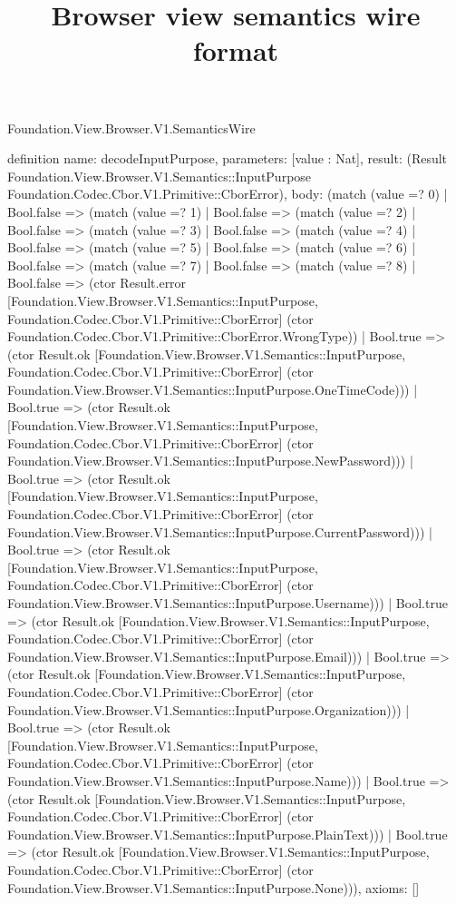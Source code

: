 \begin{lexlean}{Foundation.View.Browser.V1.SemanticsWire}
\title{Browser view semantics wire format}
\begin{semanticmodule}
definition{
  name: decodeInputPurpose,
  parameters: [value : Nat],
  result: (Result Foundation.View.Browser.V1.Semantics::InputPurpose Foundation.Codec.Cbor.V1.Primitive::CborError),
  body: (match (value =? 0)
    | Bool.false => (match (value =? 1)
      | Bool.false => (match (value =? 2)
        | Bool.false => (match (value =? 3)
          | Bool.false => (match (value =? 4)
            | Bool.false => (match (value =? 5)
              | Bool.false => (match (value =? 6)
                | Bool.false => (match (value =? 7)
                  | Bool.false => (match (value =? 8)
                    | Bool.false => (ctor Result.error [Foundation.View.Browser.V1.Semantics::InputPurpose, Foundation.Codec.Cbor.V1.Primitive::CborError] (ctor Foundation.Codec.Cbor.V1.Primitive::CborError.WrongType))
                    | Bool.true => (ctor Result.ok [Foundation.View.Browser.V1.Semantics::InputPurpose, Foundation.Codec.Cbor.V1.Primitive::CborError] (ctor Foundation.View.Browser.V1.Semantics::InputPurpose.OneTimeCode)))
                  | Bool.true => (ctor Result.ok [Foundation.View.Browser.V1.Semantics::InputPurpose, Foundation.Codec.Cbor.V1.Primitive::CborError] (ctor Foundation.View.Browser.V1.Semantics::InputPurpose.NewPassword)))
                | Bool.true => (ctor Result.ok [Foundation.View.Browser.V1.Semantics::InputPurpose, Foundation.Codec.Cbor.V1.Primitive::CborError] (ctor Foundation.View.Browser.V1.Semantics::InputPurpose.CurrentPassword)))
              | Bool.true => (ctor Result.ok [Foundation.View.Browser.V1.Semantics::InputPurpose, Foundation.Codec.Cbor.V1.Primitive::CborError] (ctor Foundation.View.Browser.V1.Semantics::InputPurpose.Username)))
            | Bool.true => (ctor Result.ok [Foundation.View.Browser.V1.Semantics::InputPurpose, Foundation.Codec.Cbor.V1.Primitive::CborError] (ctor Foundation.View.Browser.V1.Semantics::InputPurpose.Email)))
          | Bool.true => (ctor Result.ok [Foundation.View.Browser.V1.Semantics::InputPurpose, Foundation.Codec.Cbor.V1.Primitive::CborError] (ctor Foundation.View.Browser.V1.Semantics::InputPurpose.Organization)))
        | Bool.true => (ctor Result.ok [Foundation.View.Browser.V1.Semantics::InputPurpose, Foundation.Codec.Cbor.V1.Primitive::CborError] (ctor Foundation.View.Browser.V1.Semantics::InputPurpose.Name)))
      | Bool.true => (ctor Result.ok [Foundation.View.Browser.V1.Semantics::InputPurpose, Foundation.Codec.Cbor.V1.Primitive::CborError] (ctor Foundation.View.Browser.V1.Semantics::InputPurpose.PlainText)))
    | Bool.true => (ctor Result.ok [Foundation.View.Browser.V1.Semantics::InputPurpose, Foundation.Codec.Cbor.V1.Primitive::CborError] (ctor Foundation.View.Browser.V1.Semantics::InputPurpose.None))),
  axioms: []
}


\end{semanticmodule}
\end{lexlean}
